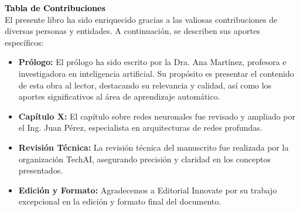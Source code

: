 \vspace*{2cm}
\textcolor{black}{\Huge \textbf{Tabla de Contribuciones}} \\[0.7cm] %

El presente libro ha sido enriquecido gracias a las valiosas contribuciones de diversas personas y entidades. A continuación, se describen sus aportes específicos:

\begin{itemize}
    \item \textbf{Prólogo:}  
    El prólogo ha sido escrito por la Dra. Ana Martínez, profesora e investigadora en inteligencia artificial. Su propósito es presentar el contenido de esta obra al lector, destacando su relevancia y calidad, así como los aportes significativos al área de aprendizaje automático.
    
    \item \textbf{Capítulo X:}  
    El capítulo sobre redes neuronales fue revisado y ampliado por el Ing. Juan Pérez, especialista en arquitecturas de redes profundas.

    \item \textbf{Revisión Técnica:}  
    La revisión técnica del manuscrito fue realizada por la organización TechAI, asegurando precisión y claridad en los conceptos presentados.

    \item \textbf{Edición y Formato:}  
    Agradecemos a Editorial Innovate por su trabajo excepcional en la edición y formato final del documento.
\end{itemize}
\clearpage